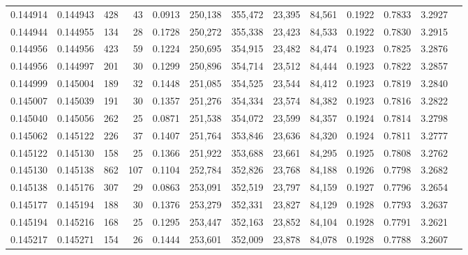 \begin{tabular}{rrrrrrrrrrrrr}
0.144914 & 0.144943 &   428 &  43 &                                     0.0913 & 250,138 & 355,472 &  23,395 &  84,561 & 0.1922 & 0.7833 & 3.2927 \\
0.144944 & 0.144955 &   134 &  28 &                                     0.1728 & 250,272 & 355,338 &  23,423 &  84,533 & 0.1922 & 0.7830 & 3.2915 \\
0.144956 & 0.144956 &   423 &  59 &                                     0.1224 & 250,695 & 354,915 &  23,482 &  84,474 & 0.1923 & 0.7825 & 3.2876 \\
0.144956 & 0.144997 &   201 &  30 &                                     0.1299 & 250,896 & 354,714 &  23,512 &  84,444 & 0.1923 & 0.7822 & 3.2857 \\
0.144999 & 0.145004 &   189 &  32 &                                     0.1448 & 251,085 & 354,525 &  23,544 &  84,412 & 0.1923 & 0.7819 & 3.2840 \\
0.145007 & 0.145039 &   191 &  30 &                                     0.1357 & 251,276 & 354,334 &  23,574 &  84,382 & 0.1923 & 0.7816 & 3.2822 \\
0.145040 & 0.145056 &   262 &  25 &                                     0.0871 & 251,538 & 354,072 &  23,599 &  84,357 & 0.1924 & 0.7814 & 3.2798 \\
0.145062 & 0.145122 &   226 &  37 &                                     0.1407 & 251,764 & 353,846 &  23,636 &  84,320 & 0.1924 & 0.7811 & 3.2777 \\
0.145122 & 0.145130 &   158 &  25 &                                     0.1366 & 251,922 & 353,688 &  23,661 &  84,295 & 0.1925 & 0.7808 & 3.2762 \\
0.145130 & 0.145138 &   862 & 107 &                                     0.1104 & 252,784 & 352,826 &  23,768 &  84,188 & 0.1926 & 0.7798 & 3.2682 \\
0.145138 & 0.145176 &   307 &  29 &                                     0.0863 & 253,091 & 352,519 &  23,797 &  84,159 & 0.1927 & 0.7796 & 3.2654 \\
0.145177 & 0.145194 &   188 &  30 &                                     0.1376 & 253,279 & 352,331 &  23,827 &  84,129 & 0.1928 & 0.7793 & 3.2637 \\
0.145194 & 0.145216 &   168 &  25 &                                     0.1295 & 253,447 & 352,163 &  23,852 &  84,104 & 0.1928 & 0.7791 & 3.2621 \\
0.145217 & 0.145271 &   154 &  26 &                                     0.1444 & 253,601 & 352,009 &  23,878 &  84,078 & 0.1928 & 0.7788 & 3.2607 \\

\end{tabular}
